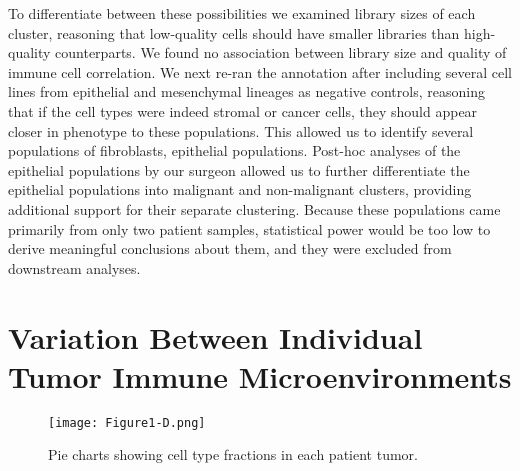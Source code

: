 To differentiate between these possibilities we examined library sizes of each cluster, reasoning that low-quality cells should have smaller libraries than high-quality counterparts. 
We found no association between library size and quality of immune cell correlation. 
We next re-ran the annotation after including several cell lines from epithelial and mesenchymal lineages as negative controls, reasoning that if the cell types were indeed stromal or cancer cells, they should appear closer in phenotype to these populations. 
This allowed us to identify several populations of fibroblasts, epithelial populations.
Post-hoc analyses of the epithelial populations by our surgeon allowed us to further differentiate the epithelial populations into malignant and non-malignant clusters, providing additional support for their separate clustering. %
Because these populations came primarily from only two patient samples, statistical power would be too low to derive meaningful conclusions about them, and they were excluded from downstream analyses. 

\section{Variation Between Individual Tumor Immune Microenvironments}

\begin{figure}
\centering
\texttt{[image: Figure1-D.png]}
\caption{Pie charts showing cell type fractions in each patient tumor. 
}
\label{fig:1d}
\end{figure}

